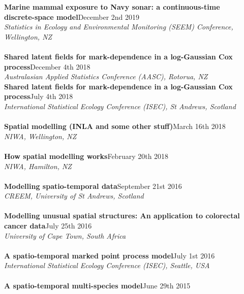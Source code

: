 \documentclass[10pt,letter]{article}
\begin{document}
          {\textbf{Marine mammal exposure to Navy sonar: a continuous-time \\
              discrete-space model}}\hfill December 2nd 2019\\
 {\sl Statistics in Ecology and Environmental Monitoring (SEEM) Conference, Wellington, NZ}\\
\hdashrule[0.5ex]{4cm}{1pt}{1pt}\\
{\textbf{Shared latent fields for mark-dependence in a log-Gaussian Cox process}}\hfill December 4th 2018\\
 {\sl Australasian Applied Statistics Conference (AASC), Rotorua, NZ}\\
  \newpage
{\textbf{Shared latent fields for mark-dependence in a log-Gaussian Cox process}}\hfill July 4th 2018\\
 {\sl International Statistical Ecology Conference (ISEC), St Andrews, Scotland}\\
 \hdashrule[0.5ex]{4cm}{1pt}{1pt}\\
{\textbf{Spatial modelling (INLA and some other stuff)}}\hfill March 16th 2018\\
 {\sl NIWA, Wellington, NZ}\\
 \hdashrule[0.5ex]{4cm}{1pt}{1pt}\\
 \noindent
{\textbf{How spatial modelling works}}\hfill February 20th 2018\\
 {\sl NIWA, Hamilton, NZ}\\
\hdashrule[0.5ex]{4cm}{1pt}{1pt}\\
{\textbf{Modelling spatio-temporal data}}\hfill September 21st 2016\\
 {\sl CREEM, University of St Andrews, Scotland}\\
\hdashrule[0.5ex]{4cm}{1pt}{1pt}\\
{\textbf{Modelling unusual spatial structures: An application to colorectal cancer data}}\hfill July 25th 2016\\
 {\sl University of Cape Town, South Africa}\\
\hdashrule[0.5ex]{4cm}{1pt}{1pt}\\
{\textbf{A spatio-temporal marked point process model}}\hfill July 1st 2016\\
 {\sl International Statistical Ecology Conference (ISEC), Seattle, USA}\\
  \hdashrule[0.5ex]{4cm}{1pt}{1pt}\\
 {\textbf{A spatio-temporal multi-species model}}\hfill June 29th 2015\\
\end{document}
